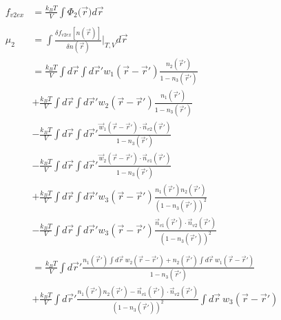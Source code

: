 \documentclass[double,12pt]{beavtex}
\begin{document}
\begin{align}
    f_{v2ex} &= \frac{k_BT}{V}\int \Phi_2(\vec{r}{) d}\vec{r} \\ \nonumber\\
    \mu_2 &= \int \frac{\delta f_{v2ex}[n(\vec r)]}{\delta n(\vec r)}
          \bigg|_{T,V} d\vec{r} \\
          &= \frac{k_BT}{V} \int d\vec r \int d \vec r' w_1(\vec r-\vec r')
          \frac{n_2(\vec r')}{1-n_3(\vec r')}   \nonumber\\
          &+\frac{k_BT}{V} \int d\vec r \int d \vec r' w_2(\vec r-\vec r')
          \frac{n_1(\vec r')}{1-n_3(\vec r')}   \nonumber\\
          &-\frac{k_BT}{V} \int d\vec r \int d \vec r'\frac{\vec w_1(\vec r 
          - \vec r')\cdot \vec n_{v2}(\vec r')}{1-n_3(\vec r')}  \nonumber\\
          &-\frac{k_BT}{V} \int d\vec r \int d \vec r'\frac{\vec w_2(\vec r 
          - \vec r')\cdot \vec n_{v1}(\vec r')}{1-n_3(\vec r')}  \nonumber\\
          &+\frac{k_BT}{V} \int d\vec r \int d \vec r' w_3(\vec r - \vec r') 
          \frac{n_1(\vec r')n_2(\vec r')}{(1-n_3(\vec r'))^2}  \nonumber\\
          &-\frac{k_BT}{V} \int d\vec r \int d \vec r' w_3(\vec r - \vec r')
           \frac{\vec n_{v1}(\vec r')\cdot \vec n_{v2}(\vec r')}
           {(1-n_3(\vec r'))^2} \\ \nonumber\\
%          
          &= \frac{k_BT}{V} \int d\vec r' \frac{n_1(\vec r')\int d \vec r
           ~w_2(\vec r - \vec r')
          +n_2(\vec r')\int d \vec r ~w_1(\vec r - \vec r')}
          {1-n_3(\vec r')} \nonumber\\
          &+\frac{k_BT}{V} \int d\vec r' \frac{n_1(\vec r')n_2(\vec r')
          -\vec n_{v1}(\vec r')
          \cdot \vec n_{v2}(\vec r')}{(1-n_3(\vec r'))^2} \int d \vec r 
          ~w_3(\vec r - \vec r') \\ \nonumber \\

\end{align}
\end{document}
